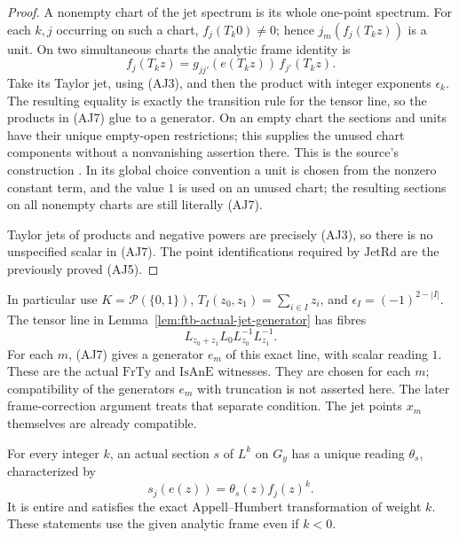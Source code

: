 \begin{proof}
A nonempty chart of the jet spectrum is its whole one-point
spectrum. For each \(k,j\) occurring on such a chart,
\(f_j(T_k0)\ne0\); hence \(j_m(f_j(T_kz))\) is a unit.
On two simultaneous charts the analytic frame identity is
\[
 f_j(T_kz)=g_{jj'}(e(T_kz))\,f_{j'}(T_kz).
\]
Take its Taylor jet, using (AJ3), and then the product with
integer exponents \(\epsilon_k\).
The resulting equality is exactly the transition rule for
the tensor line, so the products in (AJ7) glue to a generator.
On an empty chart the sections and units have their unique
empty-open restrictions; this supplies the unused chart
components without a nonvanishing assertion there.
This is the source's construction
.
In its global choice convention a unit is chosen from the
nonzero constant term, and the value \(1\) is used on an
unused chart; the resulting sections on all nonempty charts
are still literally (AJ7).

Taylor jets of products and negative powers are precisely
(AJ3), so there is no unspecified scalar in (AJ7).
The point identifications required by \(\mathrm{JetRd}\)
are the previously proved (AJ5).
\end{proof}

In particular use \(K=\mathcal P(\{0,1\})\),
\(T_I(z_0,z_1)=\sum_{i\in I}z_i\), and
\(\epsilon_I=(-1)^{2-|I|}\).
The tensor line in Lemma~\ref{lem:ftb-actual-jet-generator} has
fibres
\[
                L_{z_0+z_1}L_0L_{z_0}^{-1}L_{z_1}^{-1}.
                                                               \tag{AJ8}
\]
For each \(m\), (AJ7) gives a generator \(e_m\) of this exact
line, with scalar reading \(1\).
These are the actual \(\mathrm{FrTy}\) and
\(\mathrm{IsAnE}\) witnesses.
They are chosen for each \(m\); compatibility of the
generators \(e_m\) with truncation is not asserted here.
The later frame-correction argument treats that separate
condition. The jet points \(x_m\) themselves are already
compatible.

\begin{srlemma}
\label{lem:ftb-actual-section-entire-reading}
For every integer \(k\), an actual section \(s\) of \(L^k\)
on \(G_y\) has a unique reading \(\theta_s\), characterized by
\[
                       s_j(e(z))=\theta_s(z)f_j(z)^k.     \tag{AJ9}
\]
It is entire and satisfies the exact Appell--Humbert
transformation of weight \(k\).
These statements use the given analytic frame even if \(k<0\).
\end{srlemma}

